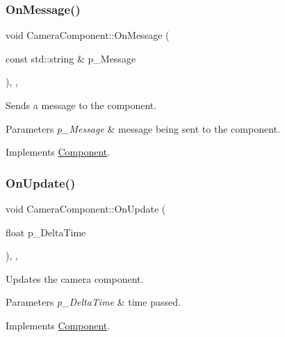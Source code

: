 \subsubsection{\texorpdfstring{OnMessage()}{OnMessage()}}
{\footnotesize\ttfamily void Camera\+Component\+::\+On\+Message (\begin{DoxyParamCaption}\item[{const std\+::string \&}]{p\+\_\+\+Message }\end{DoxyParamCaption})\hspace{0.3cm}{\ttfamily [inline]}, {\ttfamily [override]}, {\ttfamily [virtual]}}



Sends a message to the component. 


\begin{DoxyParams}{Parameters}
{\em p\+\_\+\+Message} & message being sent to the component. \\
\hline
\end{DoxyParams}


Implements \mbox{\hyperlink{class_component_a1cd106256bf1791f9c6ab347776c7788}{Component}}.

\mbox{\label{class_camera_component_a8fd406e84c5c31bcdbf0ff482c76b173}} 
\subsubsection{\texorpdfstring{OnUpdate()}{OnUpdate()}}
{\footnotesize\ttfamily void Camera\+Component\+::\+On\+Update (\begin{DoxyParamCaption}\item[{float}]{p\+\_\+\+Delta\+Time }\end{DoxyParamCaption})\hspace{0.3cm}{\ttfamily [inline]}, {\ttfamily [override]}, {\ttfamily [virtual]}}



Updates the camera component. 


\begin{DoxyParams}{Parameters}
{\em p\+\_\+\+Delta\+Time} & time passed. \\
\hline
\end{DoxyParams}


Implements \mbox{\hyperlink{class_component_ac080e9fa054949464c796b65a4b26b93}{Component}}.

